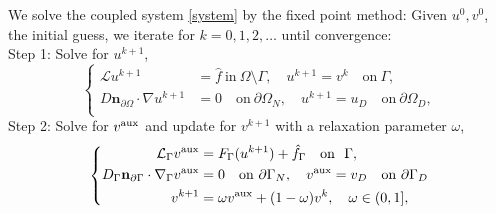 \documentclass{article}
\newcommand{\bn}{\mathbf n}
\newcommand{\cL}{\mathcal L}
\def\dO{{\partial\Omega} }
\def\dG{{\partial\Gamma} }
\begin{document}
{
We solve the coupled system \eqref{system} by the fixed point method: Given ${u}^0,{v}^0$, the initial guess,  we iterate for $k=0,1,2,\dots$ until convergence: \\
Step 1: Solve for ${u}^{k+1}$,
\begin{equation} \label{step1}
\left\{
\begin{aligned}
 \cL {u}^{k+1}&= \hat{f}~\text{in}~ \Omega\setminus\Gamma,\quad {u}^{k+1}={v}^{k} \quad \text{on}~ \Gamma,\\
 {D}\bn_\dO\cdot\nabla {u}^{k+1}&=0 \quad \text{on}~ \dO_N,\quad {u}^{k+1}=u_D \quad \text{on}~ \dO_D,\\
 \end{aligned}
\right.
\end{equation}
Step 2: Solve for ${v}^{\rm aux}$ and update for ${v}^{k+1}$ with a relaxation parameter $\omega$,
\begin{equation} \label{step2}
\left\{
\begin{aligned}
 \cL_\Gamma {v}^{\rm aux}&=  F_\Gamma(u^{k+1})+ \hat{f}_\Gamma  \quad \text{on}~~\Gamma,\\
 {D}_\Gamma\bn_\dG\cdot\nabla_\Gamma {v}^{\rm aux}&=0 \quad \text{on}~ \dG_N,\quad {v}^{\rm aux}=v_D \quad \text{on}~ \dG_D\\
 {v}^{k+1}&=\omega{v}^{\rm aux}+(1-\omega) {v}^{k},\quad \omega\in(0,1],
 \end{aligned}
\right.
\end{equation}
}
\end{document}
